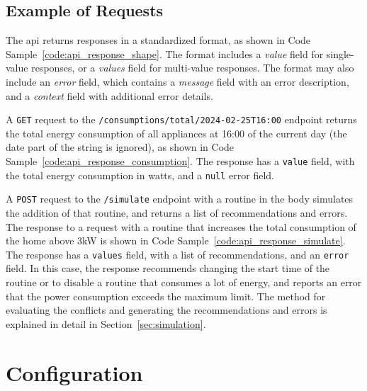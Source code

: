 \subsection{Example of Requests}



The \acrshort{api} returns responses in a standardized format, as shown in Code Sample~\ref{code:api_response_shape}. The format includes a \textit{value} field for single-value responses, or a \textit{values} field for multi-value responses. The format may also include an \textit{error} field, which contains a \textit{message} field with an error description, and a \textit{context} field with additional error details.



A \texttt{GET} request to the \texttt{/consumptions/total/2024-02-25T16:00} endpoint returns the total energy consumption of all appliances at 16:00 of the current day (the date part of the string is ignored), as shown in Code Sample~\ref{code:api_response_consumption}. The response has a \texttt{value} field, with the total energy consumption in watts, and a \texttt{null} error field.



A \texttt{POST} request to the \texttt{/simulate} endpoint with a routine in the body simulates the addition of that routine, and returns a list of recommendations and errors. The response to a request with a routine that increases the total consumption of the home above 3kW is shown in Code Sample~\ref{code:api_response_simulate}. The response has a \texttt{values} field, with a list of recommendations, and an \texttt{error} field. In this case, the response recommends changing the start time of the routine or to disable a routine that consumes a lot of energy, and reports an error that the power consumption exceeds the maximum limit. The method for evaluating the conflicts and generating the recommendations and errors is explained in detail in Section~\ref{sec:simulation}.

\section{Configuration}



